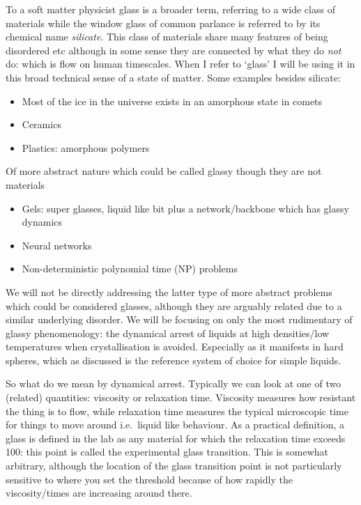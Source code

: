 \documentclass[11pt]{report}
\begin{document}
To a soft matter physicist glass is a broader term, referring to a wide class of materials while the window glass of common parlance is referred to by its chemical name \emph{silicate}.
This class of materials share many features of being disordered etc \cite{?} although in some sense they are connected by what they do \emph{not} do: which is flow on human timescales.
When I refer to `glass' I will be using it in this broad technical sense of a state of matter.
Some examples besides silicate:
\begin{itemize}
\item Most of the ice in the universe exists in an amorphous state in comets \cite{?}
\item Ceramics
\item Plastics: amorphous polymers
\end{itemize}
Of more abstract nature which could be called glassy though they are not materials
\begin{itemize}
\item Gels: super glasses, liquid like bit plus a network/backbone which has glassy dynamics
\item Neural networks
\item Non-deterministic polynomial time (NP) problems
\end{itemize}
We will not be directly addressing the latter type of more abstract problems which could be considered glasses, although they are arguably related due to a similar underlying disorder.
We will be focusing on only the most rudimentary of glassy phenomenology: the dynamical arrest of liquids at high densities/low temperatures when crystallisation is avoided.
Especially as it manifests in hard spheres, which as discussed is the reference system of choice for simple liquids.

So what do we mean by dynamical arrest.
Typically we can look at one of two (related) quantities: viscosity or relaxation time.
Viscosity measures how resistant the thing is to flow, while relaxation time measures the typical microscopic time for things to move around i.e.\ liquid like behaviour.
As a practical definition, a glass is defined in the lab as any material for which the relaxation time exceeds 100: this point is called the experimental glass transition.
This is somewhat arbitrary, although the location of the glass transition point is not particularly sensitive to where you set the threshold because of how rapidly the viscosity/times are increasing around there.
\end{document}
